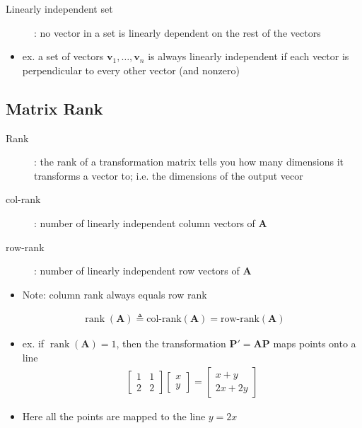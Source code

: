 \documentclass[letterpaper,12pt]{article}
\newcommand{\vect}[1]{\mathbf{#1}}
\newcommand{\matr}[1]{\mathbf{#1}}
\DeclareMathOperator{\rank}{rank}
\begin{document}
\begin{description}
 \item[Linearly independent set]: no vector in a set is linearly dependent on the rest of the vectors
\end{description}

\begin{itemize}
 \item ex. a set of vectors $\vect{v}_1, \dots, \vect{v}_n$ is always linearly independent if each vector is perpendicular to every other vector (and nonzero)
\end{itemize}


\subsection{Matrix Rank}
\begin{description}
 \item[Rank]: the rank of a transformation matrix tells you how many dimensions it transforms a vector to; i.e. the dimensions of the output vecor
 \item[col-rank]: number of linearly independent column vectors of $\matr{A}$
 \item[row-rank]: number of linearly independent row vectors of $\matr{A}$
\end{description}

\begin{itemize}
 \item Note: column rank always equals row rank
\end{itemize}
\begin{align}
 \rank(\matr{A}) \triangleq \text{col-rank}(\matr{A}) = \text{row-rank}(\matr{A})
\end{align}
\begin{itemize}
 \item ex. if $\rank(\matr{A}) = 1$, then the transformation $\vect{P}' = \matr{A} \vect{P}$ maps points onto a line
       \begin{align}
        \begin{bmatrix}
         1 & 1 \\
         2 & 2
        \end{bmatrix}
        \begin{bmatrix}
         x \\
         y
        \end{bmatrix}
        = \begin{bmatrix}
         x + y \\
         2x + 2y
        \end{bmatrix}
       \end{align}
 \item Here all the points are mapped to the line $y=2x$
\end{itemize}
\end{document}
